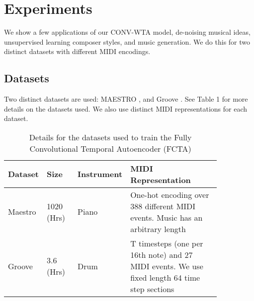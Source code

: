 \documentclass[11pt,a4paper]{article}
\begin{document}
\section{Experiments}
\label{ssec:experiments}

We show a few applications of our CONV-WTA model, de-noising musical ideas, unsupervised learning composer styles, and music generation. We do this for two distinct datasets with different MIDI encodings.


\subsection{Datasets}
\label{ssec:experiments}

Two distinct datasets are used: MAESTRO  \cite{hawthorne2018enabling}, and Groove  \cite{groove2019} . See Table 1 for more details on the datasets used. We also use distinct MIDI representations for each dataset. 

\begin{table*}[ht]
    \centering
    \begin{tabular}{p{0.15\linewidth} | p{0.15\linewidth} | p{0.1\linewidth}  | p{0.45\linewidth} }
      Dataset  & Size  & Instrument &  MIDI Representation\\ \hline
      Maestro  & 1020 (Hrs)   & Piano &  One-hot encoding over 388 different MIDI events. Music has an arbitrary length \cite{DBLP:journals/corr/abs-1808-03715} \\
        \hline
        Groove & 3.6 (Hrs)  & Drum &  T timesteps (one per 16th note) and 27 MIDI events. We use fixed length 64 time step sections \cite{groove2019} \\
    \end{tabular}
    \caption{Details for the datasets used to train the Fully Convolutional Temporal Autoencoder (FCTA) }
    \label{tab:my_label}
\end{table*}
\end{document}
